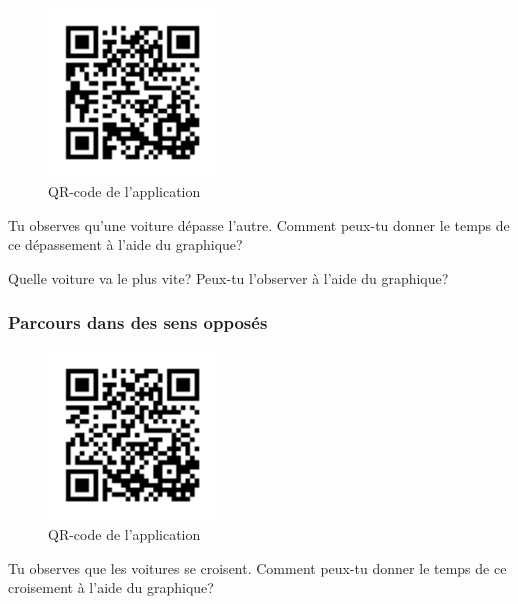 \documentclass[
  a4paper,
  DIV=11,
  numbers=noendperiod,
  sans]{scrartcl}
\theoremstyle{definition}
\theoremstyle{definition}
\theoremstyle{remark}
\begin{document}
\begin{figure}[H]

{\centering \includegraphics[width=0.4\textwidth,height=\textheight]{figures/mru/mru-2.pdf}

}

\caption{QR-code de l'application}

\end{figure}%

Tu observes qu'une voiture dépasse l'autre. Comment peux-tu donner le
temps de ce dépassement à l'aide du graphique?

Quelle voiture va le plus vite? Peux-tu l'observer à l'aide du
graphique?

\subsubsection{Parcours dans des sens
opposés}\label{parcours-dans-des-sens-opposuxe9s}

\begin{figure}[H]

{\centering \includegraphics[width=0.4\textwidth,height=\textheight]{figures/mru/mru-3.pdf}

}

\caption{QR-code de l'application}

\end{figure}%

Tu observes que les voitures se croisent. Comment peux-tu donner le
temps de ce croisement à l'aide du graphique?
\end{document}
